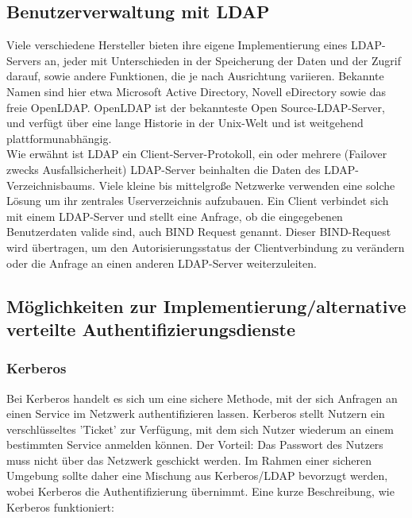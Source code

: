 \documentclass[letterpaper, 12pt]{article}
\let\tempsubsection\subsection
\renewcommand\subsection[1]{\vspace{0cm}\tempsubsection{#1}\vspace{0cm}}
\let\tempsubsubsection\subsubsection
\renewcommand\subsubsection[1]{\vspace{0cm}\tempsubsubsection{#1}\vspace{0cm}}
\begin{document}
\clearpage

\subsection{Benutzerverwaltung mit LDAP}

Viele verschiedene Hersteller bieten ihre eigene Implementierung eines LDAP-Servers
an, jeder mit Unterschieden in der Speicherung der Daten und der Zugrif darauf, sowie
andere Funktionen, die je nach Ausrichtung variieren. Bekannte Namen sind hier etwa Microsoft Active Directory, Novell eDirectory sowie das freie OpenLDAP. OpenLDAP ist der bekannteste Open Source-LDAP-Server, und verfügt über eine lange
Historie in der Unix-Welt und ist weitgehend plattformunabhängig. \\

Wie erwähnt ist LDAP ein Client-Server-Protokoll, ein oder mehrere (Failover zwecks
Ausfallsicherheit) LDAP-Server beinhalten die Daten des LDAP-Verzeichnisbaums. Viele
kleine bis mittelgroße Netzwerke verwenden eine solche Lösung um ihr zentrales
Userverzeichnis aufzubauen. Ein Client verbindet sich mit einem LDAP-Server und
stellt eine Anfrage, ob die eingegebenen Benutzerdaten valide sind, auch BIND Request
genannt. Dieser BIND-Request wird übertragen, um den Autorisierungsstatus
der Clientverbindung zu verändern oder die Anfrage an einen anderen LDAP-Server
weiterzuleiten. \cite{ce}

\subsection{Möglichkeiten zur Implementierung/alternative verteilte Authentifizierungsdienste}

\subsubsection{Kerberos}

Bei Kerberos handelt es sich um eine sichere Methode, mit der sich Anfragen an einen Service im Netzwerk authentifizieren lassen. Kerberos stellt Nutzern ein verschlüsseltes 'Ticket' zur Verfügung, mit dem sich Nutzer wiederum an einem bestimmten Service anmelden können. Der Vorteil: Das Passwort des Nutzers muss nicht über das Netzwerk geschickt werden. Im Rahmen einer sicheren Umgebung sollte daher eine Mischung aus Kerberos/LDAP bevorzugt werden, wobei Kerberos die Authentifizierung übernimmt. Eine kurze Beschreibung, wie Kerberos funktioniert:
\end{document}
